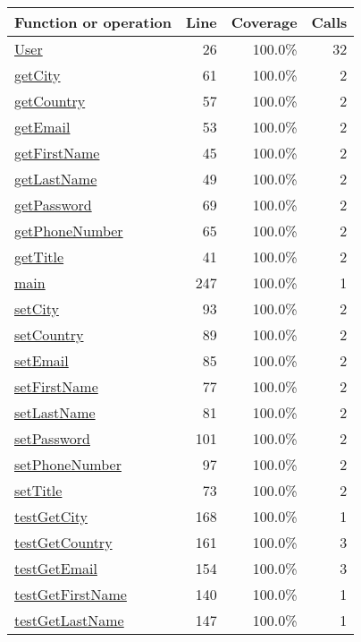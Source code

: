 \begin{longtable}{|l|r|r|r|}
\hline
Function or operation & Line & Coverage & Calls \\
\hline
\hline
\hyperref[User:26]{User} & 26&100.0\% & 32 \\
\hline
\hyperref[getCity:61]{getCity} & 61&100.0\% & 2 \\
\hline
\hyperref[getCountry:57]{getCountry} & 57&100.0\% & 2 \\
\hline
\hyperref[getEmail:53]{getEmail} & 53&100.0\% & 2 \\
\hline
\hyperref[getFirstName:45]{getFirstName} & 45&100.0\% & 2 \\
\hline
\hyperref[getLastName:49]{getLastName} & 49&100.0\% & 2 \\
\hline
\hyperref[getPassword:69]{getPassword} & 69&100.0\% & 2 \\
\hline
\hyperref[getPhoneNumber:65]{getPhoneNumber} & 65&100.0\% & 2 \\
\hline
\hyperref[getTitle:41]{getTitle} & 41&100.0\% & 2 \\
\hline
\hyperref[main:247]{main} & 247&100.0\% & 1 \\
\hline
\hyperref[setCity:93]{setCity} & 93&100.0\% & 2 \\
\hline
\hyperref[setCountry:89]{setCountry} & 89&100.0\% & 2 \\
\hline
\hyperref[setEmail:85]{setEmail} & 85&100.0\% & 2 \\
\hline
\hyperref[setFirstName:77]{setFirstName} & 77&100.0\% & 2 \\
\hline
\hyperref[setLastName:81]{setLastName} & 81&100.0\% & 2 \\
\hline
\hyperref[setPassword:101]{setPassword} & 101&100.0\% & 2 \\
\hline
\hyperref[setPhoneNumber:97]{setPhoneNumber} & 97&100.0\% & 2 \\
\hline
\hyperref[setTitle:73]{setTitle} & 73&100.0\% & 2 \\
\hline
\hyperref[testGetCity:168]{testGetCity} & 168&100.0\% & 1 \\
\hline
\hyperref[testGetCountry:161]{testGetCountry} & 161&100.0\% & 3 \\
\hline
\hyperref[testGetEmail:154]{testGetEmail} & 154&100.0\% & 3 \\
\hline
\hyperref[testGetFirstName:140]{testGetFirstName} & 140&100.0\% & 1 \\
\hline
\hyperref[testGetLastName:147]{testGetLastName} & 147&100.0\% & 1 \\
\hline

\end{longtable}
